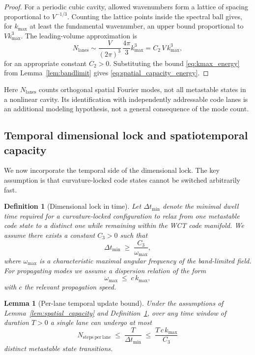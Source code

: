 \documentclass[12pt]{article}
\newtheorem{lemma}[theorem]{Lemma}
\newtheorem{definition}[theorem]{Definition}
\begin{document}
\begin{proof}
For a periodic cubic cavity, allowed wavenumbers form a lattice of
spacing proportional to $V^{-1/3}$. Counting the lattice points
inside the spectral ball gives, for $k_{\max}$ at least the
fundamental wavenumber, an upper bound proportional to $Vk_{\max}^3$.
The leading-volume approximation is
\[
N_{\mathrm{lanes}} \sim \frac{V}{(2\pi)^3} \,\frac{4\pi}{3}k_{\max}^3
= C_2\,V\,k_{\max}^3,
\]
for an appropriate constant $C_2 > 0$. Substituting the bound \eqref{eq:kmax_energy} from Lemma~\ref{lem:bandlimit} gives \eqref{eq:spatial_capacity_energy}.
\end{proof}

Here $N_{\mathrm{lanes}}$ counts orthogonal spatial Fourier modes,
not all metastable states in a nonlinear cavity. Its identification with
independently addressable code lanes is an additional modeling
hypothesis, not a general consequence of the mode count.

\subsection{Temporal dimensional lock and spatiotemporal capacity}

We now incorporate the temporal side of the dimensional lock. The key assumption is that curvature-locked code states cannot be switched arbitrarily fast.

\begin{definition}[Dimensional lock in time]
\label{def:temporal_lock}
Let $\Delta t_{\min}$ denote the minimal dwell time required for a curvature-locked configuration to relax from one metastable code state to a distinct one while remaining within the WCT code manifold. We assume there exists a constant $C_3 > 0$ such that
\begin{equation}
  \label{eq:temporal_lock}
  \Delta t_{\min} \;\ge\; \frac{C_3}{\omega_{\max}},
\end{equation}
where $\omega_{\max}$ is a characteristic maximal angular frequency of the band-limited field. For propagating modes we assume a dispersion relation of the form
\begin{equation}
  \label{eq:dispersion}
  \omega_{\max} \;\le\; c\,k_{\max},
\end{equation}
with $c$ the relevant propagation speed.
\end{definition}

\begin{lemma}[Per-lane temporal update bound]
\label{lem:lane_update_bound}
Under the assumptions of Lemma~\ref{lem:spatial_capacity} and Definition~\ref{def:temporal_lock}, over any time window of duration $T > 0$ a single lane can undergo at most
\begin{equation}
  \label{eq:steps_per_lane}
  N_{\mathrm{steps\ per\ lane}} \;\le\; \frac{T}{\Delta t_{\min}}
  \;\le\; \frac{T\,c\,k_{\max}}{C_3}
\end{equation}
distinct metastable state transitions.
\end{lemma}
\end{document}
